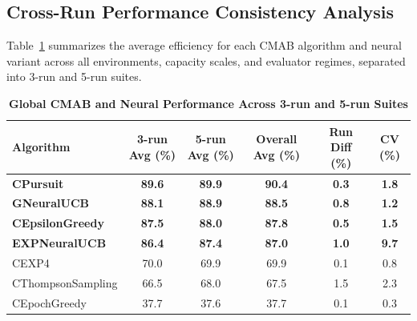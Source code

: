 \documentclass[12pt,a4paper]{article}
\newcommand{\performance}[1]{\textcolor{performancecolor}{\textbf{#1}}}
\newcommand{\legacy}[1]{\textcolor{legacycolor}{\textbf{#1}}}
\newcommand{\neural}[1]{\textcolor{neuralcolor}{\textbf{#1}}}
\begin{document}
\begin{tcolorbox}[colback=performancecolor!10,colframe=performancecolor,title=\textbf{Primary Performance Results (Aggregated Across Capacities, Environments, and Regimes)}]

\subsection{Cross-Run Performance Consistency Analysis}

Table~\ref{tab:global-performance} summarizes the average efficiency for each CMAB algorithm and neural variant across all environments, capacity scales, and evaluator regimes, separated into 3-run and 5-run suites.

\begin{table}[H]
\small
\centering
\caption{\performance{Global CMAB and Neural Performance Across 3-run and 5-run Suites}}
\label{tab:global-performance}
\begin{tabular}{|l|c|c|c|c|c|}
\hline
\textbf{Algorithm} & \textbf{3-run Avg (\%)} & \textbf{5-run Avg (\%)} & \textbf{Overall Avg (\%)} & \textbf{Run Diff (\%)} & \textbf{CV (\%)} \\
\hline
\hline
\performance{CPursuit}        & \performance{89.6} & \performance{89.9} & \performance{90.4} & \performance{0.3} & \performance{1.8} \\
\neural{GNeuralUCB}          & \neural{88.1} & \neural{88.9} & \neural{88.5} & \neural{0.8} & \neural{1.2} \\
\performance{CEpsilonGreedy} & \performance{87.5} & \performance{88.0} & \performance{87.8} & \performance{0.5} & \performance{1.5} \\
\legacy{EXPNeuralUCB}        & \legacy{86.4}     & \legacy{87.4}     & \legacy{87.0} & \legacy{1.0} & \legacy{9.7} \\
CEXP4                        & 70.0              & 69.9              & 69.9 & 0.1 & 0.8 \\
CThompsonSampling            & 66.5              & 68.0              & 67.5 & 1.5 & 2.3 \\
CEpochGreedy                 & 37.7              & 37.6              & 37.7 & 0.1 & 0.3 \\
\hline
\end{tabular}
\end{table}


\end{tcolorbox}
\end{document}
